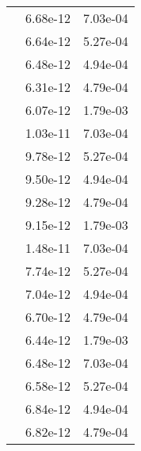 \begin{table}
\begin{tabular}{c|cc|}
\multicolumn{1}{|c|}{} & \multicolumn{1}{|c|}{  6.68e-12} & \multicolumn{1}{|c|}{  7.03e-04} \\ 
\multicolumn{1}{|c|}{} & \multicolumn{1}{|c|}{  6.64e-12} & \multicolumn{1}{|c|}{  5.27e-04} \\ 
\multicolumn{1}{|c|}{} & \multicolumn{1}{|c|}{  6.48e-12} & \multicolumn{1}{|c|}{  4.94e-04} \\ 
\multicolumn{1}{|c|}{} & \multicolumn{1}{|c|}{  6.31e-12} & \multicolumn{1}{|c|}{  4.79e-04} \\ 
\multicolumn{1}{|c|}{} & \multicolumn{1}{|c|}{  6.07e-12} & \multicolumn{1}{|c|}{  1.79e-03} \\ 
\multicolumn{1}{|c|}{} & \multicolumn{1}{|c|}{  1.03e-11} & \multicolumn{1}{|c|}{  7.03e-04} \\ 
\multicolumn{1}{|c|}{} & \multicolumn{1}{|c|}{  9.78e-12} & \multicolumn{1}{|c|}{  5.27e-04} \\ 
\multicolumn{1}{|c|}{} & \multicolumn{1}{|c|}{  9.50e-12} & \multicolumn{1}{|c|}{  4.94e-04} \\ 
\multicolumn{1}{|c|}{} & \multicolumn{1}{|c|}{  9.28e-12} & \multicolumn{1}{|c|}{  4.79e-04} \\ 
\multicolumn{1}{|c|}{} & \multicolumn{1}{|c|}{  9.15e-12} & \multicolumn{1}{|c|}{  1.79e-03} \\ 
\multicolumn{1}{|c|}{} & \multicolumn{1}{|c|}{  1.48e-11} & \multicolumn{1}{|c|}{  7.03e-04} \\ 
\multicolumn{1}{|c|}{} & \multicolumn{1}{|c|}{  7.74e-12} & \multicolumn{1}{|c|}{  5.27e-04} \\ 
\multicolumn{1}{|c|}{} & \multicolumn{1}{|c|}{  7.04e-12} & \multicolumn{1}{|c|}{  4.94e-04} \\ 
\multicolumn{1}{|c|}{} & \multicolumn{1}{|c|}{  6.70e-12} & \multicolumn{1}{|c|}{  4.79e-04} \\ 
\multicolumn{1}{|c|}{} & \multicolumn{1}{|c|}{  6.44e-12} & \multicolumn{1}{|c|}{  1.79e-03} \\ 
\multicolumn{1}{|c|}{} & \multicolumn{1}{|c|}{  6.48e-12} & \multicolumn{1}{|c|}{  7.03e-04} \\ 
\multicolumn{1}{|c|}{} & \multicolumn{1}{|c|}{  6.58e-12} & \multicolumn{1}{|c|}{  5.27e-04} \\ 
\multicolumn{1}{|c|}{} & \multicolumn{1}{|c|}{  6.84e-12} & \multicolumn{1}{|c|}{  4.94e-04} \\ 
\multicolumn{1}{|c|}{} & \multicolumn{1}{|c|}{  6.82e-12} & \multicolumn{1}{|c|}{  4.79e-04} \\ 

\end{tabular}
\end{table}
